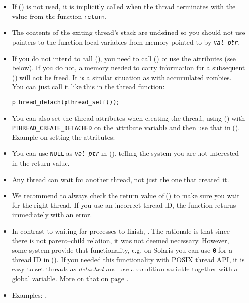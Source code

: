 \begin{itemize}
\item If () is not used, it is implicitly called when the
thread terminates with the value from the function \texttt{return}.
\item The contents of the exiting thread's stack are undefined so you should
not use pointers to the function local variables from memory pointed to by
\emph{\texttt{val\_ptr}}.
\item If you do not intend to call (), you need to call
() or use the attributes (see below).  If you do not, a
memory needed to carry information for a subsequent () will
not be freed.  It is a similar situation as with accumulated zombies.  You can
just call it like this in the thread function:
\begin{alltt}
pthread\_detach(pthread\_self());
\end{alltt}
\item You can also set the thread attributes when creating the thread, using
() with
\texttt{PTHREAD\_CREATE\_DETACHED} on the attribute variable and then use that
in ().  Example on setting the attributes:
\item You can use \texttt{NULL} as \emph{\texttt{val\_ptr}} in
(), telling the system you are not interested in the return
value.
\item Any thread can wait for another thread, not just the one that created it.
\item We recommend to always check the return value of ()
to make sure you wait for the right thread.  If you use an incorrect thread ID,
the function returns immediately with an error.
\item In contrast to waiting for processes to finish, .  The rationale is that since there is not parent--child
relation, it was not deemed necessary.  However, some system provide that
functionality, e.g.  on Solaris you can use \texttt{0} for a thread ID in
().  If you needed this functionality with POSIX thread API, it
is easy to set threads as \emph{detached} and use a condition variable together
with a global variable.  More on that on page \pageref{CONDITION_VARIABLES}.
\item {} Examples: ,
\end{itemize}


